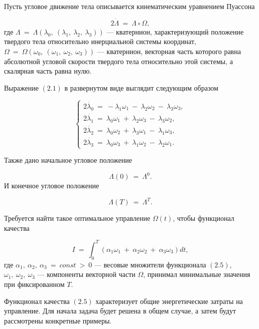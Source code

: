 \documentclass[14pt]{extreport}
\begin{document}
Пусть угловое движение тела описывается кинематическим уравнением Пуассона

\begin{equation}
2\dot{\Lambda}\ =\ \Lambda \circ \Omega,
\end{equation}
где $\Lambda\ =\ \Lambda(\lambda_0,\ (\lambda_1,\ \lambda_2,\ \lambda_3))$ --- кватернион, характеризующий положение твердого тела относительно инерциальной системы координат,
$\Omega\ =\ \Omega(\omega_0,\ (\omega_1,\ \omega_2,\ \omega_3))$ --- кватернион, векторная часть которого равна абсолютной угловой скорости твердого тела относительно этой системы,
а скалярная часть равна нулю.

Выражение $(2.1)$ в развернутом виде выглядит следующим образом

\begin{equation}
\begin{cases}
2\dot{\lambda_0}\ =\ -\lambda_1\omega_1\ -\ \lambda_2\omega_2\ -\ \lambda_3\omega_3, \\
2\dot{\lambda_1}\ =\ \lambda_0\omega_1\ +\ \lambda_2\omega_3\ -\ \lambda_3\omega_2, \\
2\dot{\lambda_2}\ =\ \lambda_0\omega_2\ +\ \lambda_3\omega_1\ -\ \lambda_1\omega_3, \\
2\dot{\lambda_3}\ =\ \lambda_0\omega_3\ +\ \lambda_1\omega_2\ -\ \lambda_2\omega_1.
 \end{cases}
\end{equation}

Также дано начальное угловое положение 

\begin{equation}
\Lambda(0)\ =\ \Lambda^0.
\end{equation}
И конечное угловое положение

\begin{equation}
\Lambda(T)\ =\ \Lambda^T.
\end{equation}

Требуется найти такое оптимальное управление $\Omega(t)$, чтобы функционал качества 

\begin{equation}
I\ =\ \int_{0}^{T}(\alpha_1\omega_1\ +\ \alpha_2\omega_2\ +\ \alpha_3\omega_3)dt,
\end{equation}
где $\alpha_1,\ \alpha_2,\ \alpha_3\ =\ const\ >\ 0$ --- весовые множители функционала $(2.5)$, $\omega_1,\ \omega_2,\ \omega_3$ --- компоненты векторной части $\Omega$,
принимал минимальные значения при фиксированном $T$.

Функционал качества $(2.5)$ характеризует общие энергетические затраты на управление.
Для начала задача будет решена в общем случае, а затем будут рассмотрены конкретные примеры.
\end{document}
